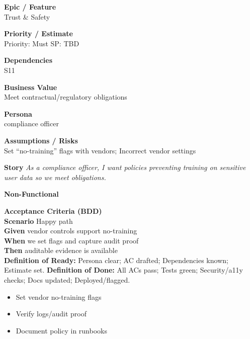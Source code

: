 \documentclass[11pt,a4paper]{article}
\newenvironment{StoryCard}[2][]{
  \begin{tcolorbox}[enhanced, breakable, sharp corners=all, colback=cardback, colframe=cardframe,
    title={#2}, fonttitle=\bfseries\large, boxrule=0.6pt, borderline west={2pt}{0pt}{accent}, #1]
}{
  \end{tcolorbox}
}
\newcommand{\badge}[1]{\pill{\footnotesize #1}}
\newcommand{\cb}{\(\square\)}
\newenvironment{TasksBox}[1][Tasks]{%
  \begin{tcolorbox}[enhanced,breakable,
    colback=cardback, colframe=cardframe, title={#1},
    borderline west={1.8pt}{0pt}{MidnightBlue},
    arc=2pt, boxrule=0.4pt,
    left=10pt,right=10pt,top=6pt,bottom=6pt,
    before skip=6pt, after skip=10pt
  ]
  \small
  \begin{itemize}[label=\cb, leftmargin=*, labelsep=0.6em, itemsep=4pt, topsep=2pt, parsep=0pt]
}{%
  \end{itemize}
  \end{tcolorbox}
}
\begin{document}
\begin{StoryCard}{S13 — Data leakage prevention}
\noindent\begin{minipage}[t]{0.49\textwidth}
\textbf{Epic / Feature}\\
Trust \& Safety

\medskip
\textbf{Priority / Estimate}\\
Priority: Must \quad SP: TBD

\medskip
\textbf{Dependencies}\\
S11
\end{minipage}\hfill
\begin{minipage}[t]{0.49\textwidth}
\textbf{Business Value}\\
Meet contractual/regulatory obligations

\medskip
\textbf{Persona}\\
compliance officer

\medskip
\textbf{Assumptions / Risks}\\
Set ``no-training'' flags with vendors; Incorrect vendor settings
\end{minipage}

\medskip
\textbf{Story} \emph{As a compliance officer, I want policies preventing training on sensitive user data so we meet obligations.}

\medskip
\textbf{Non-Functional}
\badge{Security}\ \badge{Privacy}

\medskip
\textbf{Acceptance Criteria (BDD)}\\
\textbf{Scenario} Happy path\\
\textbf{Given} vendor controls support no-training\\
\textbf{When} we set flags and capture audit proof\\
\textbf{Then} auditable evidence is available\\

\medskip
\footnotesize \textbf{Definition of Ready:} Persona clear; AC drafted; Dependencies known; Estimate set.\quad
\textbf{Definition of Done:} All ACs pass; Tests green; Security/a11y checks; Docs updated; Deployed/flagged.
\end{StoryCard}

\begin{TasksBox}[Tasks]
  \item Set vendor no-training flags
  \item Verify logs/audit proof
  \item Document policy in runbooks
\end{TasksBox}
\clearpage
\end{document}
